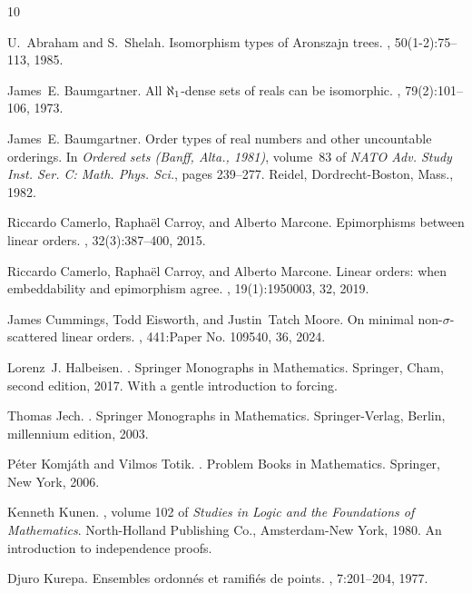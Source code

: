 \documentclass[10pt]{amsart}
\theoremstyle{definition}
\theoremstyle{remark}
\newcommand{\1}{\mathbbm{1}}
\begin{document}
\begin{thebibliography}{10}

U.~Abraham and S.~Shelah.
\newblock Isomorphism types of {A}ronszajn trees.
, 50(1-2):75--113, 1985.

James~E. Baumgartner.
\newblock All {$\aleph \sb{1}$}-dense sets of reals can be isomorphic.
, 79(2):101--106, 1973.

James~E. Baumgartner.
\newblock Order types of real numbers and other uncountable orderings.
\newblock In {\em Ordered sets ({B}anff, {A}lta., 1981)}, volume~83 of {\em
  NATO Adv. Study Inst. Ser. C: Math. Phys. Sci.}, pages 239--277. Reidel,
  Dordrecht-Boston, Mass., 1982.

Riccardo Camerlo, Rapha\"el Carroy, and Alberto Marcone.
\newblock Epimorphisms between linear orders.
, 32(3):387--400, 2015.

Riccardo Camerlo, Rapha\"el Carroy, and Alberto Marcone.
\newblock Linear orders: when embeddability and epimorphism agree.
, 19(1):1950003, 32, 2019.

James Cummings, Todd Eisworth, and Justin~Tatch Moore.
\newblock On minimal non-{$\sigma$}-scattered linear orders.
, 441:Paper No. 109540, 36, 2024.

Lorenz~J. Halbeisen.
.
\newblock Springer Monographs in Mathematics. Springer, Cham, second edition,
  2017.
\newblock With a gentle introduction to forcing.

Thomas Jech.
.
\newblock Springer Monographs in Mathematics. Springer-Verlag, Berlin,
  millennium edition, 2003.

P\'eter Komj\'ath and Vilmos Totik.
.
\newblock Problem Books in Mathematics. Springer, New York, 2006.

Kenneth Kunen.
, volume 102 of {\em Studies in Logic and the
  Foundations of Mathematics}.
\newblock North-Holland Publishing Co., Amsterdam-New York, 1980.
\newblock An introduction to independence proofs.

Djuro Kurepa.
\newblock Ensembles ordonn\'es et ramifi\'es de points.
, 7:201--204, 1977.


\end{thebibliography}
\end{document}

